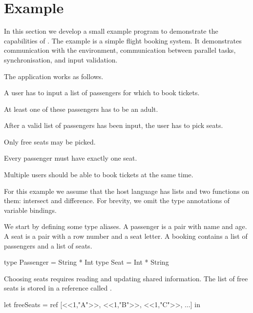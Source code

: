 
\section{Example}


In this section we develop a small example program to demonstrate the capabilities of \TOPHAT.
The example is a simple flight booking system.
It demonstrates communication with the environment, communication between parallel tasks, synchronisation, and input validation.

The application works as follows.
\begin{enumerate*}
  \item A user has to input a list of passengers for which to book tickets.
  \item At least one of these passengers has to be an adult.
  \item After a valid list of passengers has been input, the user has to pick seats.
  \item Only free seats may be picked.
  \item Every passenger must have exactly one seat.
  \item Multiple users should be able to book tickets at the same time.
\end{enumerate*}
For this example we assume that the host language has lists and two functions on them: intersect and difference.
For brevity, we omit the type annotations of variable bindings.

We start by defining some type aliases.
A passenger is a pair with name and age.
A seat is a pair with a row number and a seat letter.
A booking contains a list of passengers and a list of seats.
\begin{TASK}
  type Passenger = String * Int
  type Seat = Int * String
\end{TASK}

Choosing seats requires reading and updating shared information.
The list of free seats is stored in a reference called .
\begin{TASK}
  let freeSeats = ref [<<1,"A">>, <<1,"B">>, <<1,"C">>, ...] in
\end{TASK}

